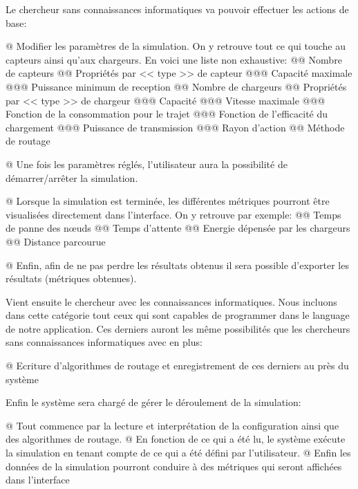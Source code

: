 \documentclass[noposter]{polytech}
\begin{document}
		Le chercheur sans connaissances informatiques va pouvoir effectuer les actions de base:
		\begin{easylist}[itemize]
			@ Modifier les paramètres de la simulation.
			On y retrouve tout ce qui touche au capteurs ainsi qu'aux chargeurs.
			En voici une liste non exhaustive:
			@@ Nombre de capteurs
			@@ Propriétés par << type >> de capteur
			@@@ Capacité maximale
			@@@ Puissance minimum de reception
			@@ Nombre de chargeurs
			@@ Propriétés par << type >> de chargeur
			@@@ Capacité
			@@@ Vitesse maximale
			@@@ Fonction de la consommation pour le trajet
			@@@ Fonction de l'efficacité du chargement
			@@@ Puissance de transmission
			@@@ Rayon d'action
			@@ Méthode de routage
			
			@ Une fois les paramètres réglés, l'utilisateur aura la possibilité de démarrer/arrêter la simulation.
			
			@ Lorsque la simulation est terminée, les différentes métriques pourront être visualisées directement dans l'interface.
			On y retrouve par exemple:
			@@ Temps de panne des n\oe uds
			@@ Temps d'attente
			@@ Energie dépensée par les chargeurs
			@@ Distance parcourue
			
			@ Enfin, afin de ne pas perdre les résultats obtenus il sera possible d'exporter les résultats (métriques obtenues).
		\end{easylist}
		
		Vient ensuite le chercheur avec les connaissances informatiques.
		Nous incluons dans cette catégorie tout ceux qui sont capables de programmer dans le language de notre application.
		Ces derniers auront les même possibilités que les chercheurs sans connaissances informatiques avec en plus:
		\begin{easylist}[itemize]
			@ Ecriture d'algorithmes de routage et enregistrement de ces derniers au près du système
		\end{easylist}
		
		Enfin le système sera chargé de gérer le déroulement de la simulation:
		\begin{easylist}[itemize]
			@ Tout commence par la lecture et interprétation de la configuration ainsi que des algorithmes de routage.
			@ En fonction de ce qui a été lu, le système exécute la simulation en tenant compte de ce qui a été défini par l'utilisateur.
			@ Enfin les données de la simulation pourront conduire à des métriques qui seront affichées dans l'interface
		\end{easylist}
\end{document}
